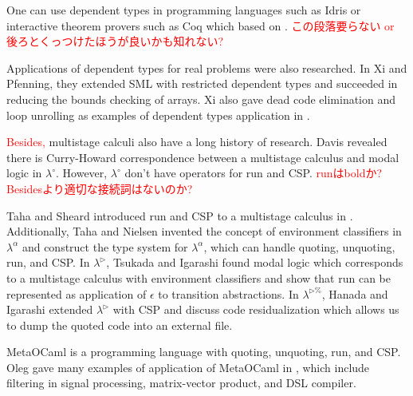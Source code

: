 \documentclass[runningheads]{llncs}
\newcommand{\red}[1]{\textcolor{red}{#1 }}
\newcommand{\LTP}{$\lambda^{\triangleright\%}$\xspace}
\newcommand{\TW}{\triangleright}
\begin{document}
One can use dependent types in programming languages such as Idris\cite{brady2013idris} or
interactive theorem provers such as Coq\cite{09thecoq} which based on \cite{coquand:inria-00076024}.
\red{この段落要らない or 後ろとくっつけたほうが良いかも知れない?}


Applications of dependent types for real problems were also researched.
In Xi and Pfenning\cite{Xi98}, they extended SML with restricted dependent types
and succeeded in reducing the bounds checking of arrays.
Xi also gave dead code elimination and loop unrolling as examples of dependent types application in \cite{xi1999dependent}.


\red{Besides,} multistage calculi also have a long history of research.
Davis revealed there is Curry-Howard correspondence between a multistage calculus and modal logic in $\lambda^\circ$\cite{davies1996temporal}.
However, $\lambda^\circ$ don't have operators for run and CSP.
\red{runはboldか? Besidesより適切な接続詞はないのか?}

Taha and Sheard introduced run and CSP to a multistage calculus in \cite{MetaML}.
Additionally, Taha and Nielsen invented the concept of environment classifiers in $\lambda^\alpha$\cite{taha2003environment} and 
construct the type system for $\lambda^\alpha$, which can handle quoting, unquoting, run, and CSP.
In $\lambda^\TW$\cite{Tsukada}, Tsukada and Igarashi found modal logic which corresponds to a multistage calculus with environment classifiers and
show that run can be represented as application of $\epsilon$ to transition abstractions.
In \LTP\cite{Hanada2014}, Hanada and Igarashi extended $\lambda^\TW$ with CSP and discuss code residualization 
which allows us to dump the quoted code into an external file.


MetaOCaml is a programming language with quoting, unquoting, run, and CSP.
Oleg gave many examples of application of MetaOCaml in \cite{8384206}, 
which include filtering in signal processing, matrix-vector product, and DSL compiler.
\end{document}
